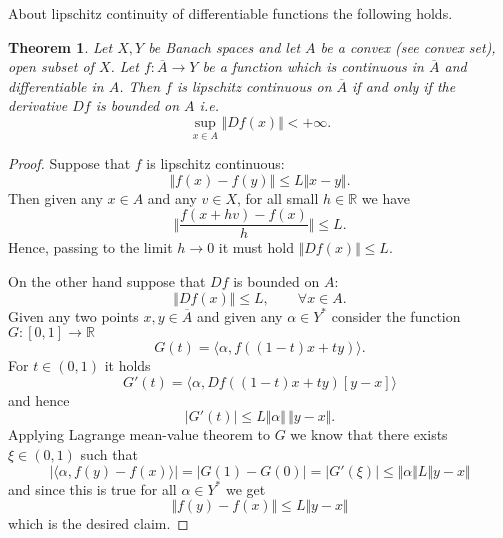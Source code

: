 \documentclass[12pt]{article}
\newtheorem{theorem}{Theorem}
\begin{document}
About lipschitz continuity of differentiable functions the following holds.

\begin{theorem}
Let $X,Y$ be Banach spaces and let $A$
be a convex (see convex set), open subset of $X$. 
Let $f\colon \overline{A}\to Y$ be a function which is continuous in $\overline A$ and differentiable in $A$. Then $f$ is lipschitz continuous on $\overline A$ 
if and only if the derivative $Df$ is bounded on $A$ i.e.
\[
   \sup_{x\in A} \Vert Df(x) \Vert < +\infty.
\]
\end{theorem}

\begin{proof}
Suppose that $f$ is lipschitz continuous:
\[
  \Vert f(x) - f(y)\Vert \le L \Vert x - y\Vert.
\]
Then given any $x\in A$ and any $v\in X$, for all small $h\in \mathbb R$ we have 
\[
   \Vert \frac{f(x+hv)-f(x)}{h}\Vert \le L.
\]
Hence, passing to the limit $h\to 0$ it must hold $\Vert Df(x)\Vert\le L$.

On the other hand suppose that $Df$ is bounded on $A$:
\[
  \Vert Df(x)\Vert \le L,\qquad \forall x \in A.
\]
Given any two points $x,y\in \overline A$ and given any $\alpha\in Y^*$ consider the function $G:[0,1]\to \mathbb R$
\[
  G(t) = \langle \alpha, f((1-t)x +t y)\rangle.
\]
For $t\in (0,1)$ it holds
\[
  G'(t) = \langle \alpha, Df((1-t)x+ty)[y-x]\rangle
\]
and hence
\[
   \vert G'(t)\vert \le L \Vert \alpha\Vert\, \Vert y-x\Vert.
\]
Applying Lagrange mean-value theorem to $G$ we know that there exists $\xi\in(0,1)$ such that
\[
  \vert \langle \alpha, f(y)-f(x)\rangle\vert =  \vert G(1)-G(0)\vert  = \vert G'(\xi)\vert \le \Vert \alpha\Vert L \Vert y-x\Vert 
\]
and since this is true for all $\alpha\in Y^*$ we get
\[
  \Vert f(y)-f(x) \Vert \le L \Vert y-x\Vert
\]
which is the desired claim.
\end{proof}
\end{document}
